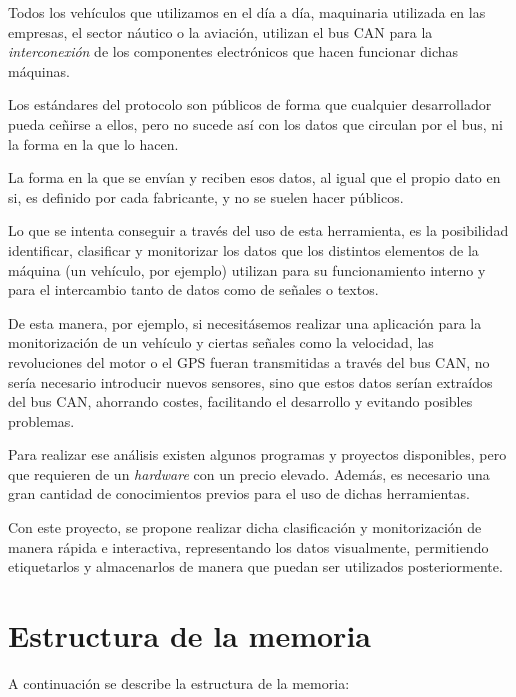 
Todos los vehículos que utilizamos en el día a día, maquinaria utilizada en las empresas, el sector náutico o la aviación, utilizan el bus CAN para la \emph{interconexión} de los componentes electrónicos que hacen funcionar dichas máquinas.

Los estándares del protocolo son públicos de forma que cualquier desarrollador pueda ceñirse a ellos, pero no sucede así con los datos que circulan por el bus, ni la forma en la que lo hacen.

La forma en la que se envían y reciben esos datos, al igual que el propio dato en si, es definido por cada fabricante, y no se suelen hacer públicos.

Lo que se intenta conseguir a través del uso de esta herramienta, es la posibilidad identificar, clasificar y monitorizar los datos que los distintos elementos de la máquina (un vehículo, por ejemplo) utilizan para su funcionamiento interno y para el intercambio tanto de datos como de señales o textos.

De esta manera, por ejemplo, si necesitásemos realizar una aplicación para la monitorización de un vehículo y ciertas señales como la velocidad, las revoluciones del motor o el GPS fueran transmitidas a través del bus CAN, no sería necesario introducir nuevos sensores, sino que estos datos serían extraídos del bus CAN, ahorrando costes, facilitando el desarrollo y evitando posibles problemas.


Para realizar ese análisis existen algunos programas y proyectos disponibles, pero que requieren de un \emph{hardware} con un precio elevado. Además, es necesario una gran cantidad de conocimientos previos para el uso de dichas herramientas.

Con este proyecto, se propone realizar dicha clasificación y monitorización de manera rápida e interactiva, representando los datos visualmente, permitiendo etiquetarlos y almacenarlos de manera que puedan ser utilizados posteriormente.

\section{Estructura de la memoria}\label{estructura-de-la-memoria}

A continuación se describe la estructura de la memoria:

